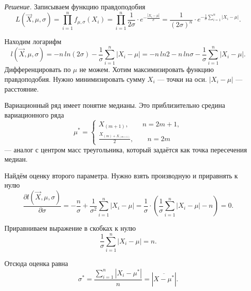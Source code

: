 \textit{Решение.} Записываем функцию правдоподобия
$$L \left( \vec{X}, \mu, \sigma \right) =
  \prod \limits_{i = 1}^n f_{ \mu, \sigma } \left( X_i \right) =
  \prod \limits_{i = 1}^n
    \frac{1}{2 \sigma } \cdot e^{- \frac{ \left| X_i - \mu \right| }{ \sigma }} =
  \frac{1}{ \left( 2 \sigma \right)^n} \cdot
  e^{- \frac{1}{ \sigma } \sum \limits_{i = 1}^n \left| X_i - \mu \right| }.$$

Находим логарифм
$$l \left( \vec{X}, \mu, \sigma \right) =
  -n \, ln \left(2 \sigma \right) -
  \frac{1}{ \sigma } \sum \limits_{i = 1}^n \left| X_i - \mu \right| =
  - n \, ln 2 -
  n \, ln \sigma -
  \frac{1}{ \sigma } \sum \limits_{i = 1}^n \left| X_i - \mu \right|.$$
Дифференцировать по $ \mu $ не можем.
Хотим максимизировать функцию правдоподобия.
Нужно минимизировать сумму $X_i$ --- точки на оси.
$ \left| X_i - \mu \right| $ --- расстояние.

Вариационный ряд имеет понятие медианы.
Это приблизительно средина вариационного ряда
$$ \mu^* =
  \begin{cases}
    X_{ \left( m + 1 \right) }, \qquad n = 2m + 1, \\
    \frac{X_{ \left( m \right) + X_{ \left( m + 1 \right) }}}{2}, \qquad n = 2m
  \end{cases}$$
--- аналог с центром масс треугольника, который задаётся как точка пересечения медиан.

Найдём оценку второго параметра.
Нужно взять производную и приравнять к нулю
$$ \frac{ \partial l \left( \vec{X}, \mu, \sigma \right) }{ \partial \sigma } =
  - \frac{n}{ \sigma } + \frac{1}{ \sigma^2} \sum \limits_{i = 1}^n \left| X_i - \mu \right| =
  \frac{1}{ \sigma } \cdot
  \left( \frac{1}{ \sigma } \sum \limits_{i = 1}^n \left| X_i - \mu \right| - n \right) =
  0.$$

Приравниваем выражение в скобках к нулю
$$ \frac{1}{ \sigma } \sum \limits_{i =1}^n \left| X_i - \mu \right| =
  n.$$

Отсюда оценка равна
$$ \sigma^* =
  \frac{ \sum \limits_{i = 1}^n \left| X_i - \mu^* \right| }{n} =
  \left| \overline{X - \mu^*} \right|.$$
